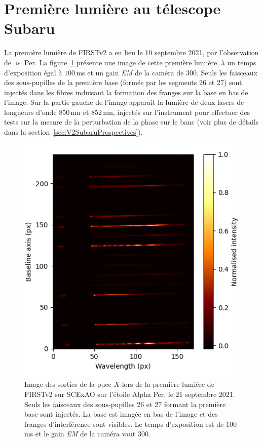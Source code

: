\section{Première lumière au télescope Subaru}

La première lumière de \ac{FIRSTv2} a eu lieu le 10 septembre 2021, par l'observation de $\upalpha$ Per. La figure~\ref{fig:V2FirstLight} présente une image de cette première lumière, à un temps d'exposition égal à $100 \,$ms et un gain \textit{EM} de la caméra de $300$. Seuls les faisceaux des sous-pupilles de la première base (formée par les segments 26 et 27) sont injectés dans les fibres induisant la formation des franges sur la base en bas de l'image. Sur la partie gauche de l'image apparaît la lumière de deux lasers de longueurs d'onde $850 \,$nm et $852 \,$nm, injectés sur l'instrument pour effectuer des tests sur la mesure de la perturbation de la phase sur le banc (voir plus de détails dans la section~\ref{sec:V2SubaruProspectives}).

\begin{figure}[ht!]
    \centering
    \includegraphics[width=\figwidth]{Figure_Chap5/20210910_AlphaPer_ODLseq1_Base1_2_Image001.png}
    \caption[Image des sorties de la puce $X$ lors de la première lumière de FIRSTv2 sur SCExAO sur l'étoile Alpha Per, le 21 septembre 2021.]{Image des sorties de la puce $X$ lors de la première lumière de FIRSTv2 sur SCExAO sur l'étoile Alpha Per, le 21 septembre 2021. Seuls les faisceaux des sous-pupilles 26 et 27 formant la première base sont injectés. La base est imagée en bas de l'image et des franges d'interférence sont visibles. Le temps d'exposition est de $100 \,$ms et le gain \textit{EM} de la caméra vaut 300.}
    \label{fig:V2FirstLight}
\end{figure}

